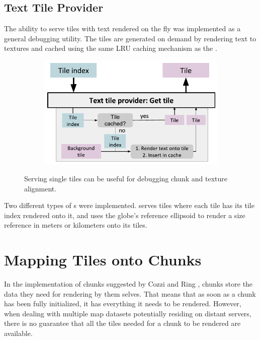 \subsection{Text Tile Provider}
The ability to serve tiles with text rendered on the fly was implemented as a general debugging utility. The tiles are generated on demand by rendering text to textures and cached using the same LRU caching mechanism as the .

\begin{figure}[htbp]
    \centering
    \begin{subfigure}[bt]{0.8\textwidth}
        \includegraphics[width=\textwidth]{figures/implementation/tileprovider/texttileprovider_gettile.pdf}
    \end{subfigure}
    \caption{Serving single tiles can be useful for debugging chunk and texture alignment.}
    \label{fig:texttileprovider_gettile}
\end{figure}

Two different types of s were implemented.  serves tiles where each tile has its tile index rendered onto it, and  uses the globe's reference ellipsoid to render a size reference in meters or kilometers onto its tiles.


\section{Mapping Tiles onto Chunks}
  
In the implementation of chunks suggested by Cozzi and Ring \cite{cozzi11}, chunks store the data they need for rendering by them selves. That means that as soon as a chunk has been fully initialized, it has everything it needs to be rendered. However, when dealing with multiple map datasets potentially residing on distant servers, there is no guarantee that all the tiles needed for a chunk to be rendered are available.

